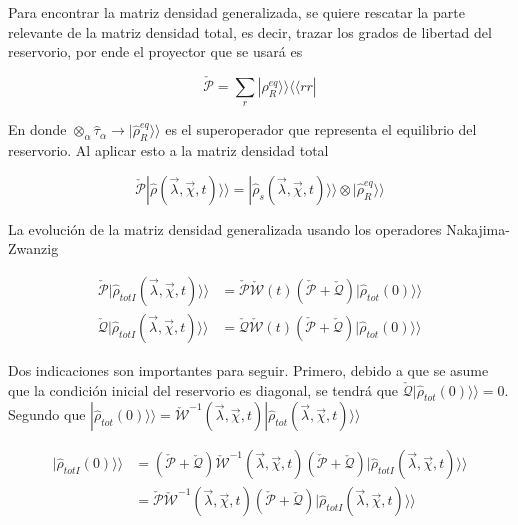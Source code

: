 \begin{appendixs}
Para encontrar la matriz densidad generalizada, se quiere rescatar la parte relevante de la matriz densidad total, es decir, trazar los grados de libertad del reservorio, por ende el proyector que se usará es 

\begin{equation*}
    \check{\mathcal{P}} = \sum_{r}|\rho_{R}^{eq} \rangle \rangle \langle \langle rr|
\end{equation*}

En donde $\otimes_{\alpha} \hat{\tau}_{\alpha} \to  |\hat{\rho}_{R}^{eq} \rangle \rangle$ es el superoperador que representa el equilibrio del reservorio. Al aplicar esto a la matriz densidad total

\begin{equation*}
    \check{\mathcal{P}}|\hat{\rho}(\vec{\lambda},\vec{\chi},t) \rangle \rangle = |\hat{\rho}_{s}(\vec{\lambda},\vec{\chi},t)\rangle \rangle \otimes |\hat{\rho}^{eq}_{R}\rangle \rangle 
\end{equation*}

La evolución de la matriz densidad generalizada usando los operadores Nakajima-Zwanzig

\begin{align}
    \check{\mathcal{P}}|\hat{\rho}_{totI}(\vec{\lambda},\vec{\chi},t)\rangle \rangle & =  \check{\mathcal{P}} \check{\mathcal{W}}(t)( \check{\mathcal{P}} +  \check{\mathcal{Q}})|\hat{\rho}_{tot}(0)\rangle \rangle  \label{apendix2proyectionev1} \\
    \check{\mathcal{Q}}|\hat{\rho}_{totI}(\vec{\lambda},\vec{\chi},t)\rangle \rangle & = \check{\mathcal{Q}} \check{\mathcal{W}}(t)( \check{\mathcal{P}} +  \check{\mathcal{Q}})|\hat{\rho}_{tot}(0)\rangle \rangle 
\label{apendix2proyectionev}
\end{align}

Dos indicaciones son importantes para seguir. Primero, debido a que se asume que la condición inicial del reservorio es diagonal, se tendrá que $\check{\mathcal{Q}}|\hat{\rho}_{tot}(0)\rangle\rangle = 0 $. Segundo 
 que $|\hat{\rho}_{tot}(0)\rangle \rangle = \check{\mathcal{W}}^{-1}(\vec{\lambda},\vec{\chi},t)|\hat{\rho}_{tot}(\vec{\lambda},\vec{\chi},t)\rangle \rangle$

\begin{align*}
    |\hat{\rho}_{totI}(0)\rangle \rangle & = (\check{\mathcal{P}} + \check{\mathcal{Q}} )\check{\mathcal{W}}^{-1}(\vec{\lambda},\vec{\chi},t)(\check{\mathcal{P}} + \check{\mathcal{Q}})|\hat{\rho}_{totI}(\vec{\lambda},\vec{\chi},t)\rangle \rangle \\
        & = \check{\mathcal{P}}\check{\mathcal{W}}^{-1}(\vec{\lambda},\vec{\chi},t)(\check{\mathcal{P}} + \check{\mathcal{Q}})|\hat{\rho}_{totI}(\vec{\lambda},\vec{\chi},t)\rangle \rangle
\end{align*}


\end{appendixs}
